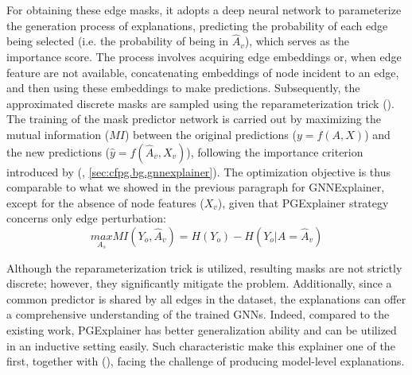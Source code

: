 \documentclass[binding=0.6cm]{sapthesis}
\newcommand{\mycite}[1]{(\cite{#1})}
\begin{document}
For obtaining these edge masks, it adopts a deep neural network to parameterize the generation process of explanations, predicting the probability of each edge being selected (i.e. the probability of being in $\hat{A}_v$), which serves as the importance score. The process involves acquiring edge embeddings or, when edge feature are not available, concatenating embeddings of node incident to an edge, and then using these embeddings to make predictions. Subsequently, the approximated discrete masks are sampled using the reparameterization trick \mycite{niculae2023-discrete}. The training of the mask predictor network is carried out by maximizing the mutual information ($MI$) between the original predictions ($y = f(A,X)$) and the new predictions ($\hat{y} = f(\hat{A}_v,X_v)$), following the importance criterion introduced by (\cite{ying2019-gnnexplainer}, \cref{sec:cfpg.bg.gnnexplainer}). The optimization objective is thus comparable to what we showed in the previous paragraph for GNNExplainer, except for the absence of node features ($X_v$), given that PGExplainer strategy concerns only edge perturbation: 
\begin{equation}
    \underset{A_s}{max} MI(Y_o,\hat{A}_v) = H(Y_o) - H(Y_o| A = \hat{A}_v)
    \label{eq:cfpg.bg.mutual-info-pge}
\end{equation}

Although the reparameterization trick is utilized, resulting masks are not strictly discrete; however, they significantly mitigate the  problem. Additionally, since a common predictor is shared by all edges in the dataset, the explanations can offer a comprehensive understanding of the trained GNNs. Indeed, compared to the existing work, PGExplainer has better generalization ability and can be utilized in an inductive setting easily. Such characteristic make this explainer one of the first, together with \mycite{yuan2020-xgnn}, facing the challenge of producing model-level explanations.   
\end{document}
